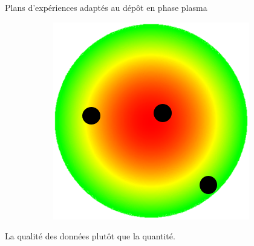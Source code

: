 \documentclass[10pt]{beamer}
\begin{document}
\begin{frame}
\begin{block}{Plans d'expériences adaptés au dépôt en phase plasma}
\begin{figure}[H]
\begin{subfigure}[l]{0.2\textwidth}
\label{fige}
\end{subfigure}%
\hspace{0.05\textwidth}
\begin{subfigure}[l]{0.2\textwidth}
\centering 
\includegraphics[width=\textwidth, height=\textwidth]{figures/doec.png}
\label{fige}
\end{subfigure}
\end{figure}
\end{block}

La qualité des données plutôt que la quantité.
\end{frame}
\end{document}
